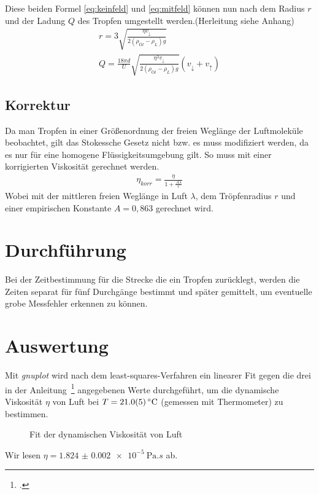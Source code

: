 Diese beiden Formel \ref{eq:keinfeld} und \ref{eq:mitfeld} können nun nach dem Radius $r$ und der Ladung $Q$ des Tropfen umgestellt werden.(Herleitung siehe Anhang)
\begin{gather}
r=3\sqrt{\frac{\eta v_{\downarrow}}{2(\rho_{Öl}-\rho_L)g}}\label{eq:radius}\\
Q = \frac{18 \pi d}{U}\sqrt{\frac{\eta^3 v_{\downarrow}}{2(\rho_{Öl}-\rho_L)g}}(v_{\downarrow}+v_{\uparrow})\label{eq:ladung}
\end{gather}
\subsection{Korrektur}
Da man Tropfen in einer Größenordnung der freien Weglänge der Luftmoleküle beobachtet, gilt das Stokessche Gesetz nicht bzw. es muss modifiziert werden, da es nur für eine homogene Flüssigkeitsumgebung gilt. So muss mit einer korrigierten Viskosität gerechnet werden.
\begin{align}
\eta_{korr}=\frac{\eta}{1+\frac{A\lambda}{r}}\label{eq:korrektur}
\end{align}
Wobei mit der mittleren freien Weglänge in Luft $\lambda$, dem Tröpfenradius $r$ und einer empirischen Konstante $A=0,863$ gerechnet wird.
\section{Durchführung}
Bei der Zeitbestimmung für die Strecke die ein Tropfen zurücklegt, werden die Zeiten separat für fünf Durchgänge bestimmt und später gemittelt, um eventuelle grobe Messfehler erkennen zu können. 
\section{Auswertung}
Mit \textit{gnuplot} wird nach dem least-squares-Verfahren ein linearer Fit gegen die drei in der Anleitung~\footcite{anleitung-ws2014} angegebenen Werte durchgeführt, um die dynamische Viskosität $\eta$ von Luft bei $T=\SI{21\pm.5}{\degreeCelsius}$ (gemessen mit Thermometer) zu bestimmen.
\begin{figure}[H]
\centering
{}
\caption{Fit der dynamischen Viskosität von Luft}
\label{fig:dynviskos}
\end{figure}
Wir lesen $\eta=\SI{1.824(2)e-5}{\pascal.s}$ ab.

